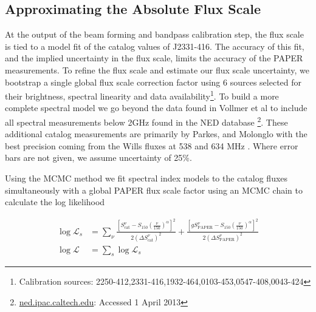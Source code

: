 \documentclass[preprint]{aastex}
\newcommand{\PAPER}{\mathrm{PAPER}}
\begin{document}
\subsection{Approximating the Absolute Flux Scale}
\label{sec:flux_scale}

At the output of the beam forming and bandpass calibration step, the flux scale
 is tied to a model fit of the catalog values of
J2331-416. The accuracy of this fit, and the implied uncertainty in the flux
scale, limits the accuracy of the PAPER measurements.  To refine the flux
scale and estimate our flux scale uncertainty, we bootstrap a single global flux scale 
correction factor using 6
sources selected for their brightness, spectral linearity and data
availability\footnote{Calibration sources:
2250-412,2331-416,1932-464,0103-453,0547-408,0043-424}. To build a more complete
spectral model we go beyond the data found in Vollmer et al to include all spectral
measurements below 2GHz found in the NED database \footnote{\url{ned.ipac.caltech.edu}: Accessed 1 April 2013}.  These additional
 catalog measurements are primarily by Parkes, and Molonglo  \citep{Kuehr:1981p9323} with the best precision coming from the
Wills fluxes at 538 and 634 MHz \citep{Wills:1975p9314}. Where error bars are not
given, we assume uncertainty of 25\%. 

Using the MCMC method we fit spectral index models to the catalog fluxes
 simultaneously with a global PAPER flux scale factor using  an MCMC chain to calculate the log likelihood

\begin{align}
\log\mathcal{L}_s &= \sum_{\nu}\frac{ \left[S_\textrm{cat}^{\nu}  - S_{150}  \left(\frac{\nu}{150}\right)^\alpha\right]^2}{2(\Delta S_\textrm{cat}^\nu)^2} +
\frac{ \left[g S_\PAPER^{\nu}  - S_{150}\left(\frac{\nu}{150}\right)^\alpha\right]^2}{2(\Delta S_\PAPER^\nu)^2} \nonumber \\
\log\mathcal{L} &= \sum_{s} \log\mathcal{L}_s
\end{align}
\end{document}
